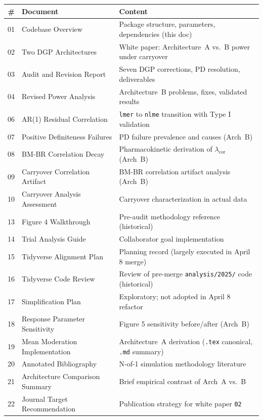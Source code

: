 \documentclass[11pt]{article}
\begin{document}
\begin{table}[h]
\centering
\small
\begin{tabular}{rll}
\toprule
\# & Document & Content \\
\midrule
01 & Codebase Overview & Package structure, parameters, dependencies (this doc) \\
02 & Two DGP Architectures & White paper: Architecture~A vs.\ B power under carryover \\
03 & Audit and Revision Report & Seven DGP corrections, PD resolution, deliverables \\
04 & Revised Power Analysis & Architecture~B problems, fixes, validated results \\
06 & AR(1) Residual Correlation & \texttt{lmer} to \texttt{nlme} transition with Type I validation \\
07 & Positive Definiteness Failures & PD failure prevalence and causes (Arch~B) \\
08 & BM-BR Correlation Decay & Pharmacokinetic derivation of $\lambda_{\text{cor}}$ (Arch~B) \\
09 & Carryover Correlation Artifact & BM-BR correlation artifact analysis (Arch~B) \\
10 & Carryover Analysis Assessment & Carryover characterization in actual data \\
13 & Figure 4 Walkthrough & Pre-audit methodology reference (historical) \\
14 & Trial Analysis Guide & Collaborator goal implementation \\
15 & Tidyverse Alignment Plan & Planning record (largely executed in April 8 merge) \\
16 & Tidyverse Code Review & Review of pre-merge \texttt{analysis/2025/} code (historical) \\
17 & Simplification Plan & Exploratory; not adopted in April 8 refactor \\
18 & Response Parameter Sensitivity & Figure 5 sensitivity before/after (Arch~B) \\
19 & Mean Moderation Implementation & Architecture~A derivation (\texttt{.tex} canonical, \texttt{.md} summary) \\
20 & Annotated Bibliography & N-of-1 simulation methodology literature \\
21 & Architecture Comparison Summary & Brief empirical contrast of Arch~A vs.\ B \\
22 & Journal Target Recommendation & Publication strategy for white paper \texttt{02} \\
\bottomrule
\end{tabular}
\end{table}
\end{document}
